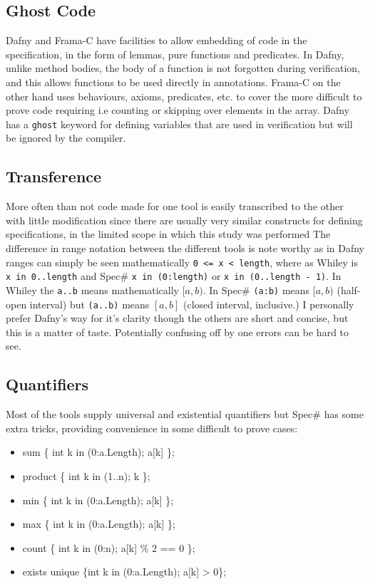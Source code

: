 \documentclass[10pt]{article} %
\begin{document}
\subsection{Ghost Code}
Dafny and Frama-C have facilities to allow embedding of code in the specification, in the form of  lemmas, pure functions and predicates. In Dafny, unlike method bodies, the body of a function is not forgotten during verification, and this allows functions to be used directly in annotations. Frama-C on the other hand uses behaviours, axioms, predicates, etc. to cover the more difficult to prove code requiring i.e counting or skipping over elements in the array. Dafny has a \verb/ghost/ keyword for defining variables that are used in verification but will be ignored by the compiler.

\subsection{Transference}
More often than not code made for one tool is easily transcribed to the other with little modification since there are usually very similar constructs for defining specifications, in the limited scope in which this study was performed The difference in range notation between the different tools is note worthy as in Dafny ranges can simply be seen mathematically \verb/0 <= x < length/, where as Whiley is \verb/x in 0..length/ and Spec\# \verb/x in (0:length)/ or \verb/x in (0..length - 1)/. In Whiley the \verb/a..b/ means mathematically $[a,b)$. In Spec\# \verb/(a:b)/ means  $[a,b)$ (half-open interval) but \verb/(a..b)/ means $[a,b]$ (closed interval, inclusive.) I personally prefer Dafny's way for it's clarity though the others are short and concise, but this is a matter of taste. Potentially confusing off by one errors can be hard to see.

\subsection{Quantifiers}
Most of the tools supply universal and existential quantifiers but Spec\# has some extra tricks, providing convenience in some difficult to prove cases:
\begin{itemize}
\item sum \{ int k in (0:a.Length); a[k] \};
\item product \{ int k in (1..n); k \};
\item min \{ int k in (0:a.Length); a[k] \};
\item max \{ int k in (0:a.Length); a[k] \};
\item count \{ int k in (0:n); a[k] \% 2 == 0 \};
\item exists unique \{int k in (0:a.Length); a[k] > 0\};
\end{itemize}
\end{document}
